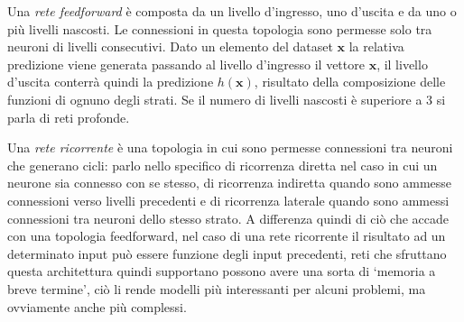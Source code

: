 \documentclass[../../main.tex]{subfiles}
\begin{document}
Una \textit{rete feedforward} è composta da un livello d'ingresso, uno d'uscita e da uno o più livelli nascosti. Le connessioni in questa topologia sono permesse solo tra neuroni di livelli consecutivi. Dato un elemento del dataset $\boldsymbol{x}$ la relativa predizione viene generata passando al livello d'ingresso il vettore $\boldsymbol{x}$, il livello d'uscita conterrà quindi la predizione $h(\boldsymbol{x})$, risultato della composizione delle funzioni di ognuno degli strati. Se il numero di livelli nascosti è superiore a 3 si parla di reti profonde.

Una \textit{rete ricorrente} è una topologia in cui sono permesse connessioni tra neuroni che generano cicli: parlo nello specifico di ricorrenza diretta nel caso in cui un neurone sia connesso con se stesso, di ricorrenza indiretta quando sono ammesse connessioni verso livelli precedenti e di ricorrenza laterale quando sono ammessi connessioni tra neuroni dello stesso strato. A differenza quindi di ciò che accade con una topologia feedforward, nel caso di una rete ricorrente il risultato ad un determinato input può essere funzione degli input precedenti, reti che sfruttano questa architettura quindi supportano possono avere una sorta di `memoria a breve termine', ciò li rende modelli più interessanti per alcuni problemi, ma ovviamente anche più complessi.
\end{document}
